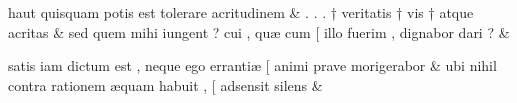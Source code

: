 \documentclass[12pt,onecolumn,twoside,a4paper]{memoir}
\begin{document}
\begin{pairs}
\begin{Leftside}
                              haut
                              quisquam
                              potis
                              est
                              tolerare
                              acritudinem \&
                         \stanza {}
                     .
                              .
                              .
                              †
                              veritatis
                              †
                              vis
                              †
                              atque
                              acritas \&
                         \stanza {}
                     sed
                              quem
                              mihi
                              iungent
                              ?
                              cui
                              ,
                              quæ
                              cum
                              [
                              illo
                              fuerim
                              ,
                              dignabor
                              dari
                              ? \&
                         \stanza {}
                     
                              satis
                              iam
                              dictum
                              est
                              ,
                              neque
                              ego
                              errantiæ
                              [
                              animi
                              prave
                              morigerabor \&
                         \stanza {}
                     ubi
                              nihil
                              contra
                              rationem
                              æquam
                              habuit
                              ,
                              [
                              adsensit
                              silens \&
                         \stanza {}
                     

\end{Leftside}
\end{pairs}
\end{document}

